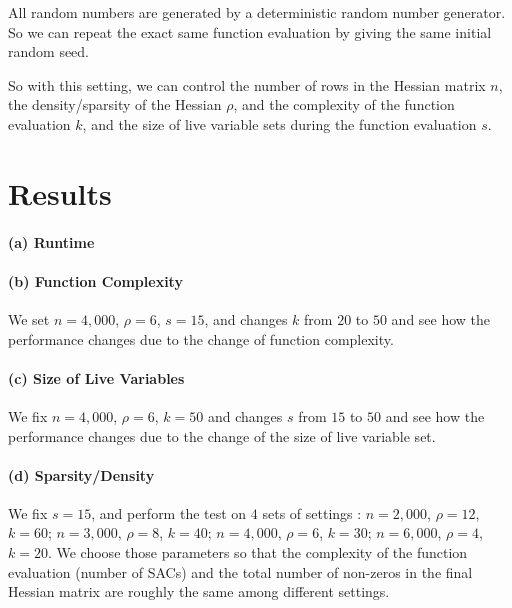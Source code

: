 \documentclass[12pt]{article}
\begin{document}
All random numbers are generated by a deterministic random number generator. So we can repeat the exact same function evaluation by giving the same initial random seed.

So with this setting, we can control the number of rows in the Hessian matrix $n$, the density/sparsity of the Hessian $\rho$, and the complexity of the function evaluation $k$, and the size of live variable sets during the function evaluation $s$.

\section*{Results}
\paragraph{(a) Runtime}
\paragraph{(b) Function Complexity} We set $n = 4,000$, $\rho = 6$, $s = 15$, and changes $k$ from $20$ to $50$ and see how the performance changes due to the change of function complexity. 
\paragraph{(c) Size of Live Variables} We fix $n = 4,000$, $\rho = 6$, $k = 50$ and changes $s$ from $15$ to $50$ and see how the performance changes due to the change of the size of live variable set.
\paragraph{(d) Sparsity/Density} We fix $s = 15$, and perform the test on $4$ sets of settings : $n=2,000$, $\rho = 12$, $k=60$; $n=3,000$, $\rho = 8$, $k=40$; $n=4,000$, $\rho=6$, $k=30$; $n=6,000$, $\rho=4$, $k=20$. We choose those parameters so that the complexity of the function evaluation (number of SACs) and the total number of non-zeros in the final Hessian matrix are roughly the same among different settings. 
\end{document}
